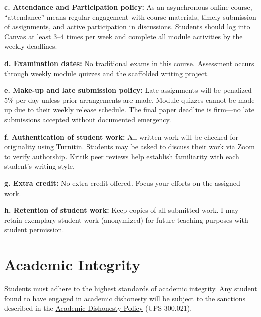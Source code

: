 \documentclass[12pt]{article}     %
\begin{document}
\vspace{1em}
\noindent \textbf{c. Attendance and Participation policy:}
As an asynchronous online course, ``attendance'' means regular engagement with course materials, timely submission of assignments, and active participation in discussions. Students should log into Canvas at least 3--4 times per week and complete all module activities by the weekly deadlines.

\vspace{1em}
\noindent \textbf{d. Examination dates:}
No traditional exams in this course. Assessment occurs through weekly module quizzes and the scaffolded writing project.

\vspace{1em}
\noindent \textbf{e. Make-up and late submission policy:}
Late assignments will be penalized 5\% per day unless prior arrangements are made. Module quizzes cannot be made up due to their weekly release schedule. The final paper deadline is firm---no late submissions accepted without documented emergency.

\vspace{1em}
\noindent \textbf{f. Authentication of student work:}
All written work will be checked for originality using Turnitin. Students may be asked to discuss their work via Zoom to verify authorship. Kritik peer reviews help establish familiarity with each student's writing style.

\vspace{1em}
\noindent \textbf{g. Extra credit:}
No extra credit offered. Focus your efforts on the assigned work.

\vspace{1em}
\noindent \textbf{h. Retention of student work:}
Keep copies of all submitted work. I may retain exemplary student work (anonymized) for future teaching purposes with student permission.

\section*{Academic Integrity}
Students must adhere to the highest standards of academic integrity. Any student found to have engaged in academic dishonesty will be subject to the sanctions described in the \href{https://www.fullerton.edu/senate/publications_policies_resolutions/ups/UPS%20300/UPS%20300.021.pdf}{Academic Dishonesty Policy} (UPS 300.021). 
\end{document}
